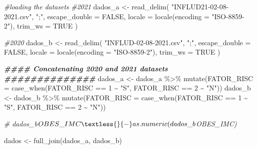 \documentclass[
]{article}
\newenvironment{Shaded}{\begin{snugshade}}{\end{snugshade}}
\newcommand{\AttributeTok}[1]{\textcolor[rgb]{0.77,0.63,0.00}{#1}}
\newcommand{\CommentTok}[1]{\textcolor[rgb]{0.56,0.35,0.01}{\textit{#1}}}
\newcommand{\ConstantTok}[1]{\textcolor[rgb]{0.00,0.00,0.00}{#1}}
\newcommand{\DecValTok}[1]{\textcolor[rgb]{0.00,0.00,0.81}{#1}}
\newcommand{\DocumentationTok}[1]{\textcolor[rgb]{0.56,0.35,0.01}{\textbf{\textit{#1}}}}
\newcommand{\FunctionTok}[1]{\textcolor[rgb]{0.00,0.00,0.00}{#1}}
\newcommand{\NormalTok}[1]{#1}
\newcommand{\OtherTok}[1]{\textcolor[rgb]{0.56,0.35,0.01}{#1}}
\newcommand{\SpecialCharTok}[1]{\textcolor[rgb]{0.00,0.00,0.00}{#1}}
\newcommand{\StringTok}[1]{\textcolor[rgb]{0.31,0.60,0.02}{#1}}
\begin{document}
\begin{Shaded}
\begin{Highlighting}[]
\CommentTok{\#loading the datasets}
\CommentTok{\#2021}
\NormalTok{dados\_a }\OtherTok{\textless{}{-}} \FunctionTok{read\_delim}\NormalTok{(}
  \StringTok{"INFLUD21{-}02{-}08{-}2021.csv"}\NormalTok{,}
  \StringTok{";"}\NormalTok{,}
  \AttributeTok{escape\_double =} \ConstantTok{FALSE}\NormalTok{,}
  \AttributeTok{locale =} \FunctionTok{locale}\NormalTok{(}\AttributeTok{encoding =} \StringTok{"ISO{-}8859{-}2"}\NormalTok{),}
  \AttributeTok{trim\_ws =} \ConstantTok{TRUE}
\NormalTok{)}

\CommentTok{\#2020}
\NormalTok{dados\_b }\OtherTok{\textless{}{-}} \FunctionTok{read\_delim}\NormalTok{(}
  \StringTok{"INFLUD{-}02{-}08{-}2021.csv"}\NormalTok{,}
  \StringTok{";"}\NormalTok{,}
  \AttributeTok{escape\_double =} \ConstantTok{FALSE}\NormalTok{,}
  \AttributeTok{locale =} \FunctionTok{locale}\NormalTok{(}\AttributeTok{encoding =} \StringTok{"ISO{-}8859{-}2"}\NormalTok{),}
  \AttributeTok{trim\_ws =} \ConstantTok{TRUE}
\NormalTok{)}


\DocumentationTok{\#\#\#\# Concatenating 2020 and 2021 datasets \#\#\#\#\#\#\#\#\#\#\#\#\#\#}
\NormalTok{dados\_a }\OtherTok{\textless{}{-}}\NormalTok{ dados\_a }\SpecialCharTok{\%\textgreater{}\%} 
  \FunctionTok{mutate}\NormalTok{(}\AttributeTok{FATOR\_RISC =} \FunctionTok{case\_when}\NormalTok{(FATOR\_RISC }\SpecialCharTok{==} \DecValTok{1} \SpecialCharTok{\textasciitilde{}} \StringTok{"S"}\NormalTok{, }
\NormalTok{                                FATOR\_RISC }\SpecialCharTok{==} \DecValTok{2} \SpecialCharTok{\textasciitilde{}} \StringTok{"N"}\NormalTok{))}
\NormalTok{dados\_b }\OtherTok{\textless{}{-}}\NormalTok{ dados\_b }\SpecialCharTok{\%\textgreater{}\%} 
  \FunctionTok{mutate}\NormalTok{(}\AttributeTok{FATOR\_RISC =} \FunctionTok{case\_when}\NormalTok{(FATOR\_RISC }\SpecialCharTok{==} \DecValTok{1} \SpecialCharTok{\textasciitilde{}} \StringTok{"S"}\NormalTok{, }
\NormalTok{                                FATOR\_RISC }\SpecialCharTok{==} \DecValTok{2} \SpecialCharTok{\textasciitilde{}} \StringTok{"N"}\NormalTok{))}

\CommentTok{\# dados\_b$OBES\_IMC \textless{}{-} as.numeric(dados\_b$OBES\_IMC)}

\NormalTok{dados }\OtherTok{\textless{}{-}} \FunctionTok{full\_join}\NormalTok{(dados\_a, dados\_b)}


\end{Highlighting}
\end{Shaded}
\end{document}

